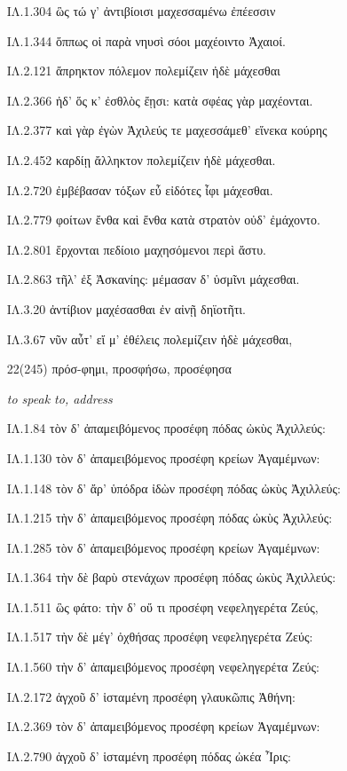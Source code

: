 \begin{enumerate}
{ΙΛ.1.304 ὣς τώ γ' ἀντιβίοισι μαχεσσαμένω ἐπέεσσιν

ΙΛ.1.344 ὅππως οἱ παρὰ νηυσὶ σόοι μαχέοιντο Ἀχαιοί.

ΙΛ.2.121 ἄπρηκτον πόλεμον πολεμίζειν ἠδὲ μάχεσθαι

ΙΛ.2.366 ἠδ' ὅς κ' ἐσθλὸς ἔῃσι: κατὰ σφέας γὰρ μαχέονται.

ΙΛ.2.377 καὶ γὰρ ἐγὼν Ἀχιλεύς τε μαχεσσάμεθ' εἵνεκα κούρης

ΙΛ.2.452 καρδίῃ ἄλληκτον πολεμίζειν ἠδὲ μάχεσθαι.

ΙΛ.2.720 ἐμβέβασαν τόξων εὖ εἰδότες ἶφι μάχεσθαι.

ΙΛ.2.779 φοίτων ἔνθα καὶ ἔνθα κατὰ στρατὸν οὐδ' ἐμάχοντο.

ΙΛ.2.801 ἔρχονται πεδίοιο μαχησόμενοι περὶ ἄστυ.

ΙΛ.2.863 τῆλ' ἐξ Ἀσκανίης: μέμασαν δ' ὑσμῖνι μάχεσθαι.

ΙΛ.3.20 ἀντίβιον μαχέσασθαι ἐν αἰνῇ δηϊοτῆτι.

ΙΛ.3.67 νῦν αὖτ' εἴ μ' ἐθέλεις πολεμίζειν ἠδὲ μάχεσθαι,

}


\clearpage
\item[\large 22(245)]{\large \g     πρόσ-φημι, προσφήσω, προσέφησα }

\hspace{0.2cm} \textit{ to speak to, address  }

{\g
ΙΛ.1.84 τὸν δ' ἀπαμειβόμενος προσέφη πόδας ὠκὺς Ἀχιλλεύς:

ΙΛ.1.130 τὸν δ' ἀπαμειβόμενος προσέφη κρείων Ἀγαμέμνων:

ΙΛ.1.148 τὸν δ' ἄρ' ὑπόδρα ἰδὼν προσέφη πόδας ὠκὺς Ἀχιλλεύς:

ΙΛ.1.215 τὴν δ' ἀπαμειβόμενος προσέφη πόδας ὠκὺς Ἀχιλλεύς:

ΙΛ.1.285 τὸν δ' ἀπαμειβόμενος προσέφη κρείων Ἀγαμέμνων:

ΙΛ.1.364 τὴν δὲ βαρὺ στενάχων προσέφη πόδας ὠκὺς Ἀχιλλεύς:

ΙΛ.1.511 ὣς φάτο: τὴν δ' οὔ τι προσέφη νεφεληγερέτα Ζεύς,

ΙΛ.1.517 τὴν δὲ μέγ' ὀχθήσας προσέφη νεφεληγερέτα Ζεύς:

ΙΛ.1.560 τὴν δ' ἀπαμειβόμενος προσέφη νεφεληγερέτα Ζεύς:

ΙΛ.2.172 ἀγχοῦ δ' ἱσταμένη προσέφη γλαυκῶπις Ἀθήνη:

ΙΛ.2.369 τὸν δ' ἀπαμειβόμενος προσέφη κρείων Ἀγαμέμνων:

ΙΛ.2.790 ἀγχοῦ δ' ἱσταμένη προσέφη πόδας ὠκέα Ἶρις:

}
\end{enumerate}
